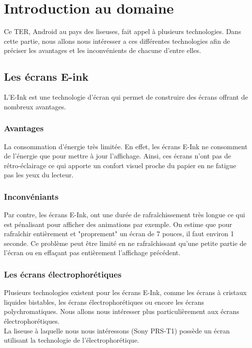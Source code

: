 \chapter{Introduction au domaine}
Ce TER, Android au pays des liseuses, fait appel à plusieurs technologies. Dans cette partie, nous allons nous intéresser a ces différentes technologies afin de préciser les avantages et les inconvénients de chacune d'entre elles.

\section{Les écrans E-ink}
L'E-Ink est une technologie d'écran qui permet de construire des écrans offrant de nombreux avantages.

\subsection{Avantages}
La consommation d'énergie très limitée. En effet, les écrans E-Ink ne consomment de l'énergie que pour mettre à jour l'affichage. Ainsi, ces écrans n'ont pas de rétro-éclairage ce qui apporte un confort visuel proche du papier en ne fatigue pas les yeux du lecteur. 

\subsection{Inconvéniants}
Par contre, les écrans E-Ink, ont une durée de rafraîchissement très longue ce qui est pénalisant pour afficher des animations par exemple. On estime que pour rafraîchir entièrement et "proprement" un écran de 7 pouces, il faut environ 1 seconde. Ce problème peut être limité en ne rafraîchissant qu'une petite partie de l'écran ou en effaçant pas entièrement l'affichage précédent. 

\subsection{Les écrans électrophorétiques}
Plusieurs technologies existent pour les écrans E-Ink, comme les écrans à cristaux liquides bistables, les écrans électrophorétiques ou encore les écrans polychromatiques. Nous allons nous intéresser plus particulièrement aux écrans électrophorétiques.\\

La liseuse à laquelle nous nous intéressons (Sony PRS-T1) possède un écran utilisant la technologie de l'électrophorétique.

